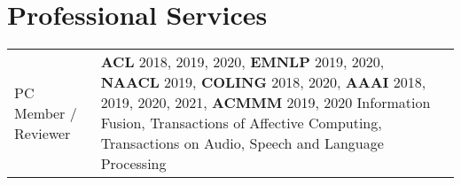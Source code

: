 \documentclass[a4paper,9pt]{article}
\begin{document}

 









\section{Professional Services}
\vspace{0.1cm}

\begin{tabular}{R{2cm}| L{11cm}}
 PC Member / Reviewer & \textbf{ACL} 2018, 2019, 2020, \textbf{EMNLP} 2019, 2020, \textbf{NAACL} 2019,  \textbf{COLING} 2018, 2020, \textbf{AAAI} 2018, 2019, 2020, 2021, \textbf{ACMMM} 2019, 2020 \newline 
 Information Fusion, 
 Transactions of Affective Computing, 
 Transactions on Audio, Speech and Language Processing \\
\end{tabular}



\end{document}
